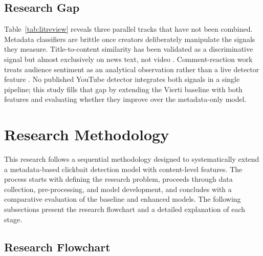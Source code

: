 \documentclass[conference]{IEEEtran}
\begin{document}
\subsection{Research Gap}
 
Table~\ref{tab:litreview} reveals three parallel tracks that have not been combined. Metadata classifiers are brittle once creators deliberately manipulate the signals they measure. Title-to-content similarity has been validated as a discriminative signal but almost exclusively on news text, not video \cite{ahmadi2023}. Comment-reaction work treats audience sentiment as an analytical observation rather than a live detector feature \cite{elyashar2022, pinoybait2024}. No published YouTube detector integrates both signals in a single pipeline; this study fills that gap by extending the Vierti baseline \cite{vierti2019} with both features and evaluating whether they improve over the metadata-only model.
 
\section{Research Methodology}
 
This research follows a sequential methodology designed to systematically extend a metadata-based clickbait detection model with content-level features. The process starts with defining the research problem, proceeds through data collection, pre-processing, and model development, and concludes with a comparative evaluation of the baseline and enhanced models. The following subsections present the research flowchart and a detailed explanation of each stage.
 
\subsection{Research Flowchart}
 
\end{document}

